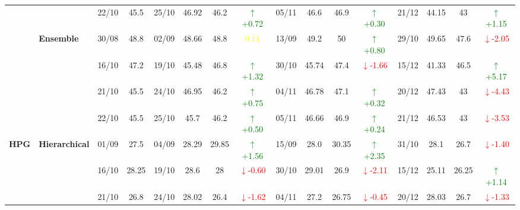 \documentclass{ieeeaccess}
\begin{document}
{\begin{longtable}{llcc|cccc|cccc|cccc}
&
& 22/10 & 45.5 & 25/10 & 46.92 & 46.2 & \textcolor{green}{\(\uparrow\)+0.72} & 05/11 & 46.6 & 46.9 & \textcolor{green}{\(\uparrow\)+0.30} & 21/12 & 44.15 & 43 & \textcolor{green}{\(\uparrow\)+1.15} \\
\cmidrule(lr){2-16}



& \textbf{Ensemble}
& 30/08 & 48.8 & 02/09 & 48.66 & 48.8 & \textcolor{yellow}{0.14} & 13/09 & 49.2 & 50 & \textcolor{green}{\(\uparrow\)+0.80} & 29/10 & 49.65 & 47.6 & \textcolor{red}{\(\downarrow\)-2.05} \\

&
& 16/10 & 47.2 & 19/10 & 45.48 & 46.8 & \textcolor{green}{\(\uparrow\)+1.32} & 30/10 & 45.74 & 47.4 & \textcolor{red}{\(\downarrow\)-1.66} & 15/12 & 41.33 & 46.5 & \textcolor{green}{\(\uparrow\)+5.17} \\

&
& 21/10 & 45.5 & 24/10 & 46.95 & 46.2 & \textcolor{green}{\(\uparrow\)+0.75} & 04/11 & 46.78 & 47.1 & \textcolor{green}{\(\uparrow\)+0.32} & 20/12 & 47.43 & 43 & \textcolor{red}{\(\downarrow\)-4.43} \\

&
& 22/10 & 45.5 & 25/10 & 45.7 & 46.2 & \textcolor{green}{\(\uparrow\)+0.50} & 05/11 & 46.66 & 46.9 & \textcolor{green}{\(\uparrow\)+0.24} & 21/12 & 46.53 & 43 & \textcolor{red}{\(\downarrow\)-3.53} \\
\midrule


\multirow{12}{*}{\textbf{HPG}} 
& \textbf{Hierarchical}
& 01/09 & 27.5 & 04/09 & 28.29 & 29.85 & \textcolor{green}{\(\uparrow\)+1.56} & 15/09 & 28.0 & 30.35 & \textcolor{green}{\(\uparrow\)+2.35} & 31/10 & 28.1 & 26.7 & \textcolor{red}{\(\downarrow\)-1.40} \\

& 
& 16/10 & 28.25 & 19/10 & 28.6 & 28 & \textcolor{red}{\(\downarrow\)-0.60} & 30/10 & 29.01 & 26.9 & \textcolor{red}{\(\downarrow\)-2.11} & 15/12 & 25.11 & 26.25 & \textcolor{green}{\(\uparrow\)+1.14} \\

& 
& 21/10 & 26.8 & 24/10 & 28.02 & 26.4 & \textcolor{red}{\(\downarrow\)-1.62} & 04/11 & 27.2 & 26.75 & \textcolor{red}{\(\downarrow\)-0.45} & 20/12 & 28.03 & 26.7 & \textcolor{red}{\(\downarrow\)-1.33} \\


\end{longtable}}
\end{document}
